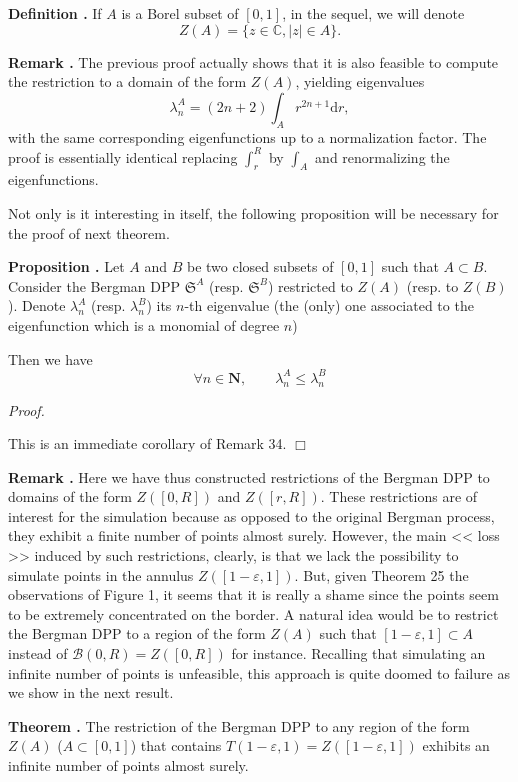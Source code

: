 \documentclass[11pt]{article}
\newcommand{\qed}{\hfill$\Box$}
\newcounter{cnt}
\newcommand{\cnt}{\thecnt \stepcounter{cnt}}
\begin{document}
\textbf{Definition \cnt.} If $A$ is a Borel subset of $[0,1]$, in the sequel, we will denote 
\[
Z(A) = \{z \in \mathbb{C}, |z| \in A\}.
\]

\textbf{Remark \cnt.} The previous proof actually shows that it is also feasible to compute the restriction to a domain of the form $ Z(A) $, yielding eigenvalues
\[
\lambda_n^A = (2n+2)\int_A r^{2n+1} \mathrm dr,
\] 
with the same corresponding eigenfunctions up to a normalization factor. The proof is essentially identical replacing $ \int_r^R $ by $ \int_A $ and renormalizing the eigenfunctions.

Not only is it interesting in itself, the following proposition will be necessary for the proof of next theorem.

\textbf{Proposition \cnt.} Let $ A $ and $B$ be two closed subsets of $ [0,1] $ such that $ A \subset B $. Consider the Bergman DPP $ \mathfrak S^A $ (resp. $ \mathfrak S^B $) restricted to $Z(A)$ (resp. to $Z(B)$). Denote $ \lambda^A_n $ (resp. $ \lambda^B_n $) its $n$-th eigenvalue (the (only) one associated to the eigenfunction which is a monomial of degree $n$)

Then we have 
\[
    \forall n \in \mathbf N, \qquad \lambda_n^A \le \lambda_n^B
\]

\textit{Proof.} 

This is an immediate corollary of Remark 34. \qed

\textbf{Remark \cnt.} Here we have thus constructed restrictions of the Bergman DPP to domains of the form $ Z([0,R]) $ and $ Z([r,R]) $. These restrictions are of interest for the simulation because as opposed to the original Bergman process, they exhibit a finite number of points almost surely. However, the main << loss >> induced by such restrictions, clearly, is that we lack the possibility to simulate points in the annulus $ Z([1-\varepsilon,1]) $. But, given Theorem 25 the observations of Figure 1, it seems that it is really a shame since the points seem to be extremely concentrated on the border. A natural idea would be to restrict the Bergman DPP to a region of the form $ Z(A) $ such that $ [1-\varepsilon, 1] \subset A$ instead of $ \mathcal B(0,R) = Z([0,R]) $ for instance. Recalling that simulating an infinite number of points is unfeasible, this approach is quite doomed to failure as we show in the next result.

\textbf{Theorem \cnt.} The restriction of the Bergman DPP to any region of the form $ Z(A) $ ($ A \subset [0,1] $) that contains $ T(1-\varepsilon,1) = Z([1-\varepsilon,1]) $ exhibits an infinite number of points almost surely.
\end{document}
